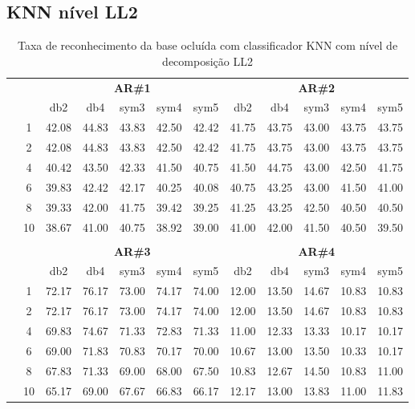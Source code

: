\subsection{KNN nível LL2}
\begin{table}[H]
	\centering
    \normalsize
	\caption{Taxa de reconhecimento da base ocluída com classificador KNN com nível de decomposição LL2}
	\begin{tabular}{|c|c|c c c c c|c c c c c|}
\cline{3-12}
\multicolumn{2}{c|}{\multirow{2}{*}{}} & \multicolumn{5}{c|}{\textbf{AR\#1}}  & \multicolumn{5}{c|}{\textbf{AR\#2}} \\\cline{3-12}

\multicolumn{2}{c|}{}  & db2 & db4 & sym3 & sym4 & sym5 & db2 & db4& sym3 & sym4 & sym5 \\\hline
\multicolumn{1}{|c|}{ \multirow{5}{*}{\rotatebox[origin=c]{90}{\textbf{K-vizinhos}}} }
&1	 &42.08 	& 44.83& 	 43.83& 	 42.50& 	 42.42 &	 41.75 	 &43.75& 	 43.00& 	 43.75& 	 43.75\\\cline{2-12}
&2	 &42.08 	& 44.83& 	 43.83& 	 42.50& 	 42.42 &	 41.75 	 &43.75& 	 43.00& 	 43.75& 	 43.75\\\cline{2-12}
&4	 &40.42 	& 43.50& 	 42.33& 	 41.50& 	 40.75 &	 41.50 	 &44.75& 	 43.00& 	 42.50& 	 41.75\\\cline{2-12}
&6	 &39.83 	& 42.42& 	 42.17& 	 40.25& 	 40.08 &	 40.75 	 &43.25& 	 43.00& 	 41.50& 	 41.00\\\cline{2-12}
&8	 &39.33 	& 42.00& 	 41.75& 	 39.42& 	 39.25 &	 41.25 	 &43.25& 	 42.50& 	 40.50& 	 40.50\\\cline{2-12}
&10	 &38.67 	& 41.00& 	 40.75& 	 38.92& 	 39.00 &	 41.00 	 &42.00& 	 41.50& 	 40.50& 	 39.50

\\ \midrule
\multicolumn{12}{c}{}\\ 

\cline{3-12}
\multicolumn{2}{c}{} & \multicolumn{5}{|c|}{\textbf{AR\#3}}  & \multicolumn{5}{c|}{\textbf{AR\#4}} \\\cline{3-12}
\multicolumn{2}{c}{}  & \multicolumn{1}{|c}{db2} & db4 & sym3 & sym4 & sym5 & db2 & db4& sym3 & sym4 & sym5 \\\hline
\multicolumn{1}{|c|}{ \multirow{6}{*}{\rotatebox[origin=c]{90}{\textbf{K-vizinhos}}} }
&1	&72.17&	76.17&	73.00&	74.17&	74.00&	12.00&	13.50&	14.67&	10.83&	10.83	\\\cline{2-12}
&2	&72.17&	76.17&	73.00&	74.17&	74.00&	12.00&	13.50&	14.67&	10.83&	10.83	\\\cline{2-12}
&4	&69.83&	74.67&	71.33&	72.83&	71.33&	11.00&	12.33&	13.33&	10.17&	10.17	\\\cline{2-12}
&6	&69.00&	71.83&	70.83&	70.17&	70.00&	10.67&	13.00&	13.50&	10.33&	10.17	\\\cline{2-12}
&8	&67.83&	71.33&	69.00&	68.00&	67.50&	10.83&	12.67&	14.50&	10.83&	11.00	\\\cline{2-12}
&10	&65.17&	69.00&	67.67&	66.83&	66.17&	12.17&	13.00&	13.83&	11.00&	11.83	
	

\\\midrule
\end{tabular}

\end{table}


